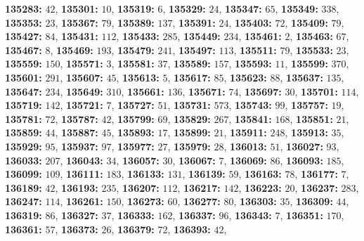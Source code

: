 \textsf{\bfseries 135283:} $42$, \textsf{\bfseries 135301:} $10$, \textsf{\bfseries 135319:} $6$, \textsf{\bfseries 135329:} $24$, \textsf{\bfseries 135347:} $65$, \textsf{\bfseries 135349:} $338$, \textsf{\bfseries 135353:} $23$, \textsf{\bfseries 135367:} $79$, \textsf{\bfseries 135389:} $137$, \textsf{\bfseries 135391:} $24$, \textsf{\bfseries 135403:} $72$, \textsf{\bfseries 135409:} $79$, \textsf{\bfseries 135427:} $84$, \textsf{\bfseries 135431:} $112$, \textsf{\bfseries 135433:} $285$, \textsf{\bfseries 135449:} $234$, \textsf{\bfseries 135461:} $2$, \textsf{\bfseries 135463:} $67$, \textsf{\bfseries 135467:} $8$, \textsf{\bfseries 135469:} $193$, \textsf{\bfseries 135479:} $241$, \textsf{\bfseries 135497:} $113$, \textsf{\bfseries 135511:} $79$, \textsf{\bfseries 135533:} $23$, \textsf{\bfseries 135559:} $150$, \textsf{\bfseries 135571:} $3$, \textsf{\bfseries 135581:} $37$, \textsf{\bfseries 135589:} $157$, \textsf{\bfseries 135593:} $11$, \textsf{\bfseries 135599:} $370$, \textsf{\bfseries 135601:} $291$, \textsf{\bfseries 135607:} $45$, \textsf{\bfseries 135613:} $5$, \textsf{\bfseries 135617:} $85$, \textsf{\bfseries 135623:} $88$, \textsf{\bfseries 135637:} $135$, \textsf{\bfseries 135647:} $234$, \textsf{\bfseries 135649:} $310$, \textsf{\bfseries 135661:} $136$, \textsf{\bfseries 135671:} $74$, \textsf{\bfseries 135697:} $30$, \textsf{\bfseries 135701:} $114$, \textsf{\bfseries 135719:} $142$, \textsf{\bfseries 135721:} $7$, \textsf{\bfseries 135727:} $51$, \textsf{\bfseries 135731:} $573$, \textsf{\bfseries 135743:} $99$, \textsf{\bfseries 135757:} $19$, \textsf{\bfseries 135781:} $72$, \textsf{\bfseries 135787:} $42$, \textsf{\bfseries 135799:} $69$, \textsf{\bfseries 135829:} $267$, \textsf{\bfseries 135841:} $168$, \textsf{\bfseries 135851:} $21$, \textsf{\bfseries 135859:} $44$, \textsf{\bfseries 135887:} $45$, \textsf{\bfseries 135893:} $17$, \textsf{\bfseries 135899:} $21$, \textsf{\bfseries 135911:} $248$, \textsf{\bfseries 135913:} $35$, \textsf{\bfseries 135929:} $95$, \textsf{\bfseries 135937:} $97$, \textsf{\bfseries 135977:} $27$, \textsf{\bfseries 135979:} $28$, \textsf{\bfseries 136013:} $51$, \textsf{\bfseries 136027:} $93$, \textsf{\bfseries 136033:} $207$, \textsf{\bfseries 136043:} $34$, \textsf{\bfseries 136057:} $30$, \textsf{\bfseries 136067:} $7$, \textsf{\bfseries 136069:} $86$, \textsf{\bfseries 136093:} $185$, \textsf{\bfseries 136099:} $109$, \textsf{\bfseries 136111:} $183$, \textsf{\bfseries 136133:} $131$, \textsf{\bfseries 136139:} $59$, \textsf{\bfseries 136163:} $78$, \textsf{\bfseries 136177:} $7$, \textsf{\bfseries 136189:} $42$, \textsf{\bfseries 136193:} $235$, \textsf{\bfseries 136207:} $112$, \textsf{\bfseries 136217:} $142$, \textsf{\bfseries 136223:} $20$, \textsf{\bfseries 136237:} $283$, \textsf{\bfseries 136247:} $114$, \textsf{\bfseries 136261:} $150$, \textsf{\bfseries 136273:} $60$, \textsf{\bfseries 136277:} $80$, \textsf{\bfseries 136303:} $35$, \textsf{\bfseries 136309:} $44$, \textsf{\bfseries 136319:} $86$, \textsf{\bfseries 136327:} $37$, \textsf{\bfseries 136333:} $162$, \textsf{\bfseries 136337:} $96$, \textsf{\bfseries 136343:} $7$, \textsf{\bfseries 136351:} $170$, \textsf{\bfseries 136361:} $57$, \textsf{\bfseries 136373:} $26$, \textsf{\bfseries 136379:} $72$, \textsf{\bfseries 136393:} $42$, 
